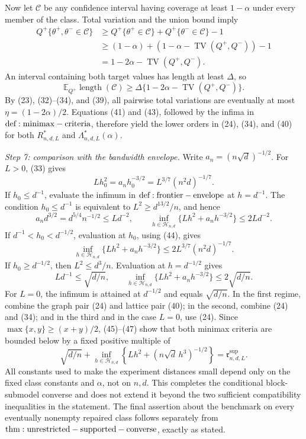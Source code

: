 Now let \(\mathcal C\) be any confidence interval having coverage at least \(1-\alpha\) under every member of the class.  Total variation and the union bound imply
\[
 \begin{aligned}
 Q^+\{\theta^+,\theta^-\in\mathcal C\}
 &\geq Q^+\{\theta^+\in\mathcal C\}
       +Q^+\{\theta^-\in\mathcal C\}-1\\
 &\geq(1-\alpha)+(1-\alpha-\operatorname{TV}(Q^+,Q^-))-1\\
 &=1-2\alpha-\operatorname{TV}(Q^+,Q^-).
 \end{aligned}
\tag{42}
\]
An interval containing both target values has length at least \(\Delta\), so
\[
 \mathbb E_{Q^+}\operatorname{length}(\mathcal C)
 \geq\Delta\{1-2\alpha-\operatorname{TV}(Q^+,Q^-)\}.
\tag{43}
\]
By (23), (32)--(34), and (39), all pairwise total variations are eventually at most \(\eta=(1-2\alpha)/2\).  Equations (41) and (43), followed by the infima in \({\rm def:minimax-criteria}\), therefore yield the lower orders in (24), (34), and (40) for both \(R^*_{n,d,L}\) and \(\Lambda^*_{n,d,L}(\alpha)\).

\textit{Step 7: comparison with the bandwidth envelope.}
Write \(a_n=(n\sqrt d)^{-1/2}\).  For \(L>0\), (33) gives
\[
 Lh_0^2=a_nh_0^{-3/2}=L^{3/7}(n^2d)^{-1/7}.
\tag{44}
\]
If \(h_0\leq d^{-1}\), evaluate the infimum in \({\rm def:frontier-envelope}\) at \(h=d^{-1}\).  The condition \(h_0\leq d^{-1}\) is equivalent to \(L^2\geq d^{13/2}/n\), and hence
\[
 a_nd^{3/2}=d^{5/4}n^{-1/2}\leq Ld^{-2},
 \qquad
 \inf_{h\in\mathcal H_{n,d}}\{Lh^2+a_nh^{-3/2}\}\leq2Ld^{-2}.
\tag{45}
\]
If \(d^{-1}<h_0<d^{-1/2}\), evaluation at \(h_0\), using (44), gives
\[
 \inf_{h\in\mathcal H_{n,d}}\{Lh^2+a_nh^{-3/2}\}
 \leq2L^{3/7}(n^2d)^{-1/7}.
\tag{46}
\]
If \(h_0\geq d^{-1/2}\), then \(L^2\leq d^3/n\).  Evaluation at \(h=d^{-1/2}\) gives
\[
 Ld^{-1}\leq\sqrt{d/n},
 \qquad
 \inf_{h\in\mathcal H_{n,d}}\{Lh^2+a_nh^{-3/2}\}
 \leq2\sqrt{d/n}.
\tag{47}
\]
For \(L=0\), the infimum is attained at \(d^{-1/2}\) and equals \(\sqrt{d/n}\).  In the first regime, combine the graph pair (24) and lattice pair (40); in the second, combine (24) and (34); and in the third and in the case \(L=0\), use (24).  Since \(\max\{x,y\}\geq(x+y)/2\), (45)--(47) show that both minimax criteria are bounded below by a fixed positive multiple of
\[
 \sqrt{d/n}+\inf_{h\in\mathcal H_{n,d}}
 \left\{Lh^2+(n\sqrt d\,h^3)^{-1/2}\right\}
 =\mathfrak r^{\mathrm{sup}}_{n,d,L}.
\tag{48}
\]
All constants used to make the experiment distances small depend only on the fixed class constants and \(\alpha\), not on \(n,d\).  This completes the conditional block-submodel converse and does not extend it beyond the two sufficient compatibility inequalities in the statement.  The final assertion about the benchmark on every eventually nonempty repaired class follows separately from \({\rm thm:unrestricted-supported-converse}\), exactly as stated.